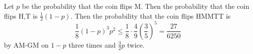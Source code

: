 Let $p$ be the probability that the coin flips M. Then the probability that the coin flips H,T is $\frac{1}{2}\left(1-p\right)$. Then the probability that the coin flips HMMTT is \[\frac{1}{8}\left(1-p\right)^3p^2\leq\frac{1}{8}\cdot\frac{4}{9}\left(\frac{3}{5}\right)^5=\boxed{\frac{27}{6250}}\] by AM-GM on $1-p$ three times and $\frac{3}{2}p$ twice.